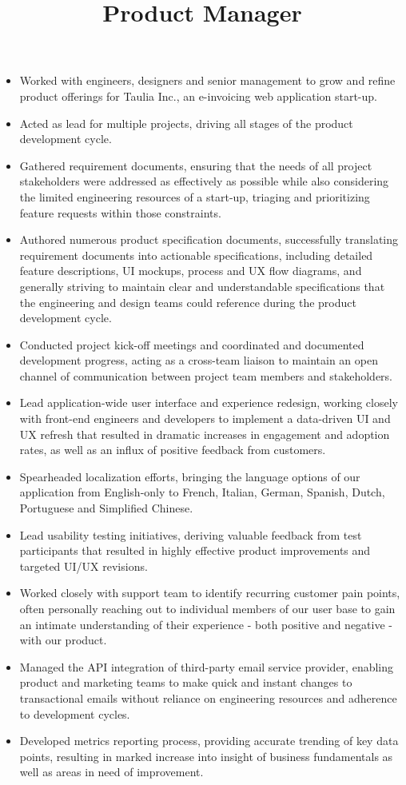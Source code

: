 \begin{resume}
\title{Product Manager}
\begin{position}
\begin{itemize}
	\item Worked with engineers, designers and senior management to grow and refine product offerings for Taulia Inc., an e-invoicing web application start-up.
	\item Acted as lead for multiple projects, driving all stages of the product development cycle.
	\item Gathered requirement documents, ensuring that the needs of all project stakeholders were addressed as effectively as possible while also considering the limited engineering resources of a start-up, triaging and prioritizing feature requests within those constraints.
	\item Authored numerous product specification documents, successfully translating requirement documents into actionable specifications, including detailed feature descriptions, UI mockups, process and UX flow diagrams, and generally striving to maintain clear and understandable specifications that the engineering and design teams could reference during the product development cycle.
	\item Conducted project kick-off meetings and coordinated and documented development progress, acting as a cross-team liaison to maintain an open channel of communication between project team members and stakeholders.
	\item Lead application-wide user interface and experience redesign, working closely with front-end engineers and developers to implement a data-driven UI and UX refresh that resulted in dramatic increases in engagement and adoption rates, as well as an influx of positive feedback from customers.
	\item Spearheaded localization efforts, bringing the language options of our application from English-only to French, Italian, German, Spanish, Dutch, Portuguese and Simplified Chinese.
	\item Lead usability testing initiatives, deriving valuable feedback from test participants that resulted in highly effective product improvements and targeted UI/UX revisions.
	\item Worked closely with support team to identify recurring customer pain points, often personally reaching out to individual members of our user base to gain an intimate understanding of their experience - both positive and negative - with our product.
	\item Managed the API integration of third-party email service provider, enabling product and marketing teams to make quick and instant changes to transactional emails without reliance on engineering resources and adherence to development cycles.
	\item Developed metrics reporting process, providing accurate trending of key data points, resulting in marked increase into insight of business fundamentals as well as areas in need of improvement.
\end{itemize}
\end{position}


\end{resume}
